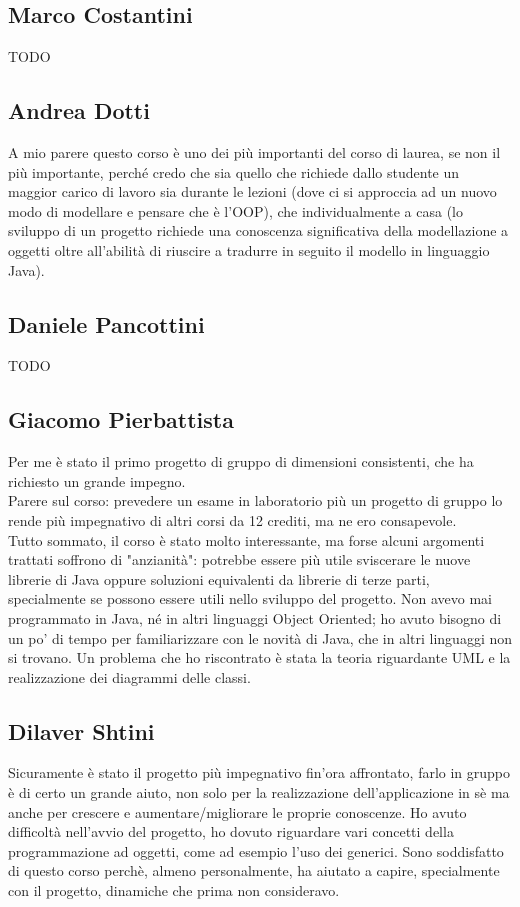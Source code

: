 \documentclass[a4paper,12pt]{report}
\begin{document}
\subsection*{Marco Costantini}
{TODO}

\subsection*{Andrea Dotti}
A mio parere questo corso è uno dei più importanti del corso di laurea, se non il più importante, perché credo che sia quello che richiede dallo studente un maggior carico di lavoro sia durante le lezioni (dove ci si approccia ad un nuovo modo di modellare e pensare che è l'OOP), che individualmente a casa (lo sviluppo di un progetto richiede una conoscenza significativa della modellazione a oggetti oltre all'abilità di riuscire a tradurre in seguito il modello in linguaggio Java).

\subsection*{Daniele Pancottini}
{TODO}

\subsection*{Giacomo Pierbattista}
Per me è stato il primo progetto di gruppo di dimensioni consistenti, che ha richiesto un grande impegno. 
\\Parere sul corso: prevedere un esame in laboratorio più un progetto di gruppo lo rende più
impegnativo di altri corsi da 12 crediti, ma ne ero consapevole. 
\\Tutto sommato, il corso è stato molto interessante, ma forse alcuni argomenti trattati soffrono di "anzianità":
potrebbe essere più utile sviscerare le nuove librerie di Java oppure soluzioni equivalenti da librerie di terze parti,
specialmente se possono essere utili nello sviluppo del progetto.
Non avevo mai programmato in Java, né in altri linguaggi Object Oriented; ho avuto bisogno 
di un po' di tempo per familiarizzare con le novità di Java, che in altri linguaggi non si trovano.
Un problema che ho riscontrato è stata la teoria riguardante UML e la realizzazione dei diagrammi delle classi.


\subsection*{Dilaver Shtini}
Sicuramente è stato il progetto più impegnativo fin'ora affrontato, farlo in gruppo è di certo un grande aiuto,
non solo per la realizzazione dell'applicazione in sè ma anche per crescere e aumentare/migliorare le proprie conoscenze.
Ho avuto difficoltà nell'avvio del progetto, ho dovuto riguardare vari concetti della programmazione ad oggetti,
come  ad esempio l'uso dei generici. Sono soddisfatto di questo corso perchè, almeno personalmente, ha aiutato a capire,
specialmente con il progetto, dinamiche che prima non consideravo.
\end{document}
